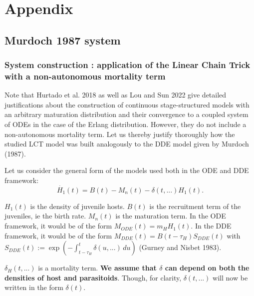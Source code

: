 \documentclass[12pt,a4paper,onecolumn]{article}
\newcommand{\noPageNumber}{\thispagestyle{empty}}
\begin{document}
\printbibliography[heading=bibintoc, keyword={main},title={References}]

\printbibliography[heading=bibintoc, notkeyword={main},title={Survey of Erlang/Gamma distribution shape references}]




\newpage
\noPageNumber
\appendix
\section{Appendix}
\setcounter{equation}{0}

\subsection{Murdoch 1987 system}
\subsubsection{System construction : application of the Linear Chain Trick with a non-autonomous mortality term}
Note that Hurtado et al. 2018 as well as Lou and Sun 2022 give detailed justifications about the construction of continuous stage-structured models with an arbitrary maturation distribution and their convergence to a coupled system of ODEs in the case of the Erlang distribution. However, they do not include a non-autonomous mortality term. Let us thereby justify thoroughly how the studied LCT model was built analogously to the DDE model given by Murdoch (1987).

Let us consider the general form of the models used both in the ODE and DDE framework:
\begin{equation}
\dot{H_{1}}(t) = B(t) - M_n(t) - \delta(t, ...) H_1(t).
\end{equation}

$H_1(t)$ is the density of juvenile hosts. $B(t)$ is the recruitment term of the juveniles, ie the birth rate. $M_n(t)$ is the maturation term. In the ODE framework, it would be of the form $M_{ODE}(t)= m_H H_1(t)$. In the DDE framework, it would be of the form $M_{DDE}(t) = B(t-\tau_H)S_{DDE}(t)$ with $S_{DDE}(t) := \exp\left( -\int_{t-\tau_H}^{t} \delta(u, ...) \, du \right)$ (Gurney and Nisbet 1983). 

$\delta_H(t, ...)$ is a mortality term. \textbf{We assume that $\delta$ can depend on both the densities of host and parasitoids}. Though, for clarity, $\delta(t, ...)$ will now be written in the form $\delta(t)$.
\end{document}
